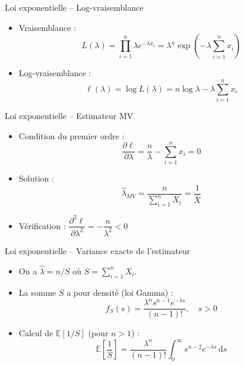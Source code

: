 \documentclass[11pt,aspectratio=169]{beamer}
\newcommand{\dd}{\mathrm{d}}
\begin{document}
\begin{frame}{Loi exponentielle -- Log-vraisemblance}

\begin{itemize}

\item Vraisemblance :
  \[
  L(\lambda) = \prod_{i=1}^n \lambda e^{-\lambda x_i} = \lambda^n \exp\left(-\lambda \sum_{i=1}^n x_i\right)
  \]

\item Log-vraisemblance :
  \[
  \ell(\lambda) = \log L(\lambda) = n \log \lambda - \lambda \sum_{i=1}^n x_i
  \]

\end{itemize}

\end{frame}

\begin{frame}{Loi exponentielle -- Estimateur MV}

\begin{itemize}

\item Condition du premier ordre :
  \[
  \frac{\partial \ell}{\partial \lambda} = \frac{n}{\lambda} - \sum_{i=1}^n x_i = 0
  \]

\item Solution :
  \[
  \boxed{\hat{\lambda}_{MV} = \frac{n}{\sum_{i=1}^n X_i} = \frac{1}{\bar{X}}}
  \]

\item Vérification : $\dfrac{\partial^2 \ell}{\partial \lambda^2} = -\dfrac{n}{\lambda^2} < 0$ \checkmark

\end{itemize}

\end{frame}

\begin{frame}{Loi exponentielle -- Variance exacte de l'estimateur}

\begin{itemize}

\item On a $\hat{\lambda} = n/S$ où $S = \sum_{i=1}^n X_i$.\newline

\item La somme $S$ a pour densité (loi Gamma) :
  \[
  f_S(s) = \frac{\lambda^n s^{n-1} e^{-\lambda s}}{(n-1)!}, \quad s > 0
  \]

\item Calcul de $\mathbb{E}[1/S]$ (pour $n > 1$) :
  \[
  \mathbb{E}\left[\frac{1}{S}\right] = \frac{\lambda^n}{(n-1)!} \int_0^\infty s^{n-2} e^{-\lambda s} \, \dd s
  \]

\end{itemize}

\end{frame}
\end{document}
